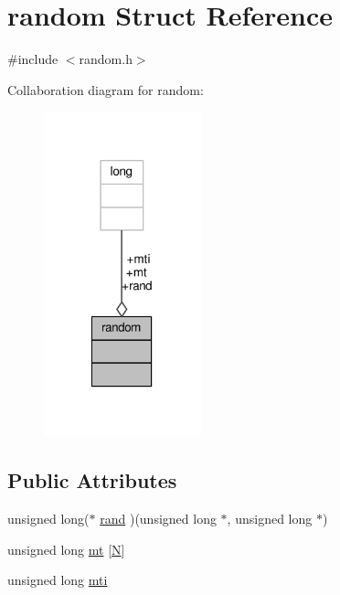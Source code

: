 \hypertarget{structrandom}{\section{random Struct Reference}
\label{structrandom}
}


{\ttfamily \#include $<$random.\-h$>$}



Collaboration diagram for random\-:
\nopagebreak
\begin{figure}[H]
\begin{center}
\leavevmode
\includegraphics[width=129pt]{structrandom__coll__graph}
\end{center}
\end{figure}
\subsection*{Public Attributes}
\begin{DoxyCompactItemize}
\item 
unsigned long($\ast$ \hyperlink{structrandom_a1aaa791fa4cd14e5039c410455332dd4}{rand} )(unsigned long $\ast$, unsigned long $\ast$)
\item 
unsigned long \hyperlink{structrandom_a88e5c20c56e6078759147a679f5bec01}{mt} \mbox{[}\hyperlink{mt19937ar_8h_a0240ac851181b84ac374872dc5434ee4}{N}\mbox{]}
\item 
unsigned long \hyperlink{structrandom_a72b297b4d896cddc9103c986f6901d7d}{mti}
\end{DoxyCompactItemize}


